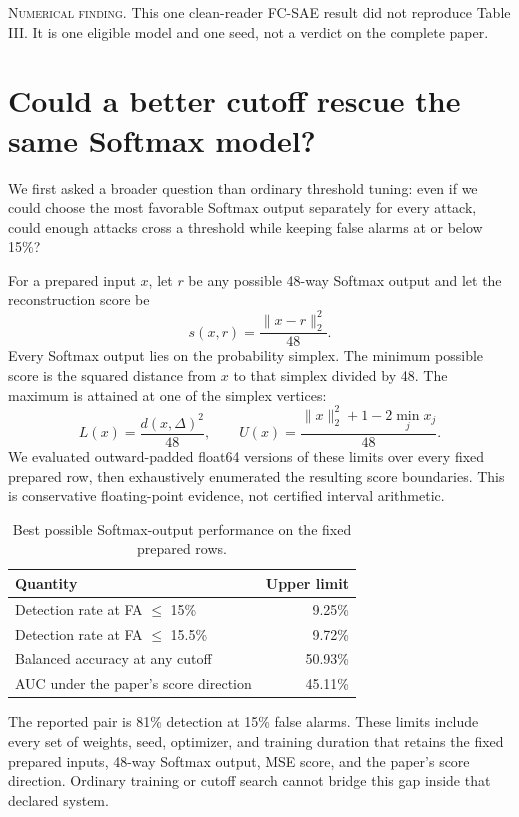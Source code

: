 \documentclass[11pt]{article}
\newcommand{\status}[1]{\textcolor{evidenceblue}{\textsc{#1}}}
\begin{document}
\noindent\status{Numerical finding.} This one clean-reader FC-SAE result did
not reproduce Table III. It is one eligible model and one seed, not a verdict
on the complete paper.

\section{Could a better cutoff rescue the same Softmax model?}

We first asked a broader question than ordinary threshold tuning: even if we
could choose the most favorable Softmax output separately for every attack,
could enough attacks cross a threshold while keeping false alarms at or below
15\%?

For a prepared input \(x\), let \(r\) be any possible 48-way Softmax output and
let the reconstruction score be
\[
  s(x,r)=\frac{\lVert x-r\rVert_2^2}{48}.
\]
Every Softmax output lies on the probability simplex. The minimum possible
score is the squared distance from \(x\) to that simplex divided by 48. The
maximum is attained at one of the simplex vertices:
\[
  L(x)=\frac{d(x,\Delta)^2}{48}, \qquad
  U(x)=\frac{\lVert x\rVert_2^2+1-2\min_j x_j}{48}.
\]
We evaluated outward-padded float64 versions of these limits over every fixed
prepared row, then exhaustively enumerated the resulting score boundaries.
This is conservative floating-point evidence, not certified interval
arithmetic.

\begin{table}[ht]
\centering
\caption{Best possible Softmax-output performance on the fixed prepared rows.}
\begin{tabular}{L{0.51\textwidth}r}
\toprule
Quantity & Upper limit \\
\midrule
Detection rate at FA $\leq$ 15\% & 9.25\% \\
Detection rate at FA $\leq$ 15.5\% & 9.72\% \\
Balanced accuracy at any cutoff & 50.93\% \\
AUC under the paper's score direction & 45.11\% \\
\bottomrule
\end{tabular}
\end{table}

The reported pair is 81\% detection at 15\% false alarms. These limits include
every set of weights, seed, optimizer, and training duration that retains the
fixed prepared inputs, 48-way Softmax output, MSE score, and the paper's score
direction. Ordinary training or cutoff search cannot bridge this gap inside
that declared system.
\end{document}
